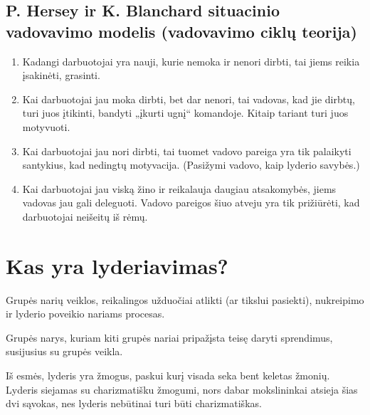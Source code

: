 \subsection{P. Hersey ir K. Blanchard situacinio vadovavimo modelis
(vadovavimo ciklų teorija)}

\begin{enumerate}
  \item Kadangi darbuotojai yra nauji, kurie nemoka ir nenori dirbti,
    tai jiems reikia įsakinėti, grasinti.
  \item Kai darbuotojai jau moka dirbti, bet dar nenori, tai vadovas,
    kad jie dirbtų, turi juos įtikinti, bandyti „įkurti ugnį“ komandoje.
    Kitaip tariant turi juos motyvuoti.
  \item Kai darbuotojai jau nori dirbti, tai tuomet vadovo pareiga yra tik
    palaikyti santykius, kad nedingtų motyvacija. (Pasižymi vadovo, kaip
    lyderio savybės.)
  \item Kai darbuotojai jau viską žino ir reikalauja daugiau atsakomybės,
    jiems vadovas jau gali deleguoti. Vadovo pareigos šiuo atveju yra tik
    prižiūrėti, kad darbuotojai neišeitų iš rėmų.
\end{enumerate}

\section{Kas yra lyderiavimas?}

\begin{defn}[Lyderiavimas]
  Grupės narių veiklos, reikalingos užduočiai atlikti (ar tikslui pasiekti),
  nukreipimo ir lyderio poveikio nariams procesas.
\end{defn}

\begin{defn}[Lyderis]
  Grupės narys, kuriam kiti grupės nariai pripažįsta teisę daryti
  sprendimus, susijusius su grupės veikla.
\end{defn}

Iš esmės, lyderis yra žmogus, paskui kurį visada seka bent keletas žmonių.
Lyderis siejamas su charizmatišku žmogumi, nors dabar mokslininkai
atsieja šias dvi sąvokas, nes lyderis nebūtinai turi būti charizmatiškas.

